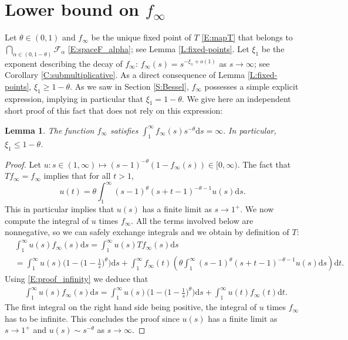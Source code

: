 \documentclass[11pt]{article}
\newtheorem{lemma}[theorem]{Lemma}
\theoremstyle{remark}
\newcommand{\Fc}{\mathcal{F}}
\renewcommand{\d}{\mathrm{d}}
\numberwithin{equation}{section}
\begin{document}
\appendix

\section{Lower bound on \texorpdfstring{$f_\infty$}{f infinity}}\label{S:app_lower}
Let $\theta \in (0,1)$ and $f_\infty$ be the unique fixed point of $T$ \eqref{E:mapT} that belongs to $\bigcap_{\alpha \in (0,1-\theta)} \Fc_\alpha$ \eqref{E:spaceF_alpha}; see Lemma \ref{L:fixed-points}. Let $\xi_1$ be the exponent describing the decay of $f_\infty$: $f_\infty(s) = s^{-\xi_1+o(1)}$ as $s \to \infty$; see Corollary \ref{C:submultiplicative}.
As a direct consequence of Lemma \ref{L:fixed-points}, $\xi_1 \geq 1-\theta$.
As we saw in Section \ref{S:Bessel}, $f_\infty$ possesses a simple explicit expression, implying in particular that $\xi_1 = 1-\theta$.
We give here an independent short proof of this fact that does not rely on this expression:


\begin{lemma}\label{L:upper_bound_exponent}
The function $f_\infty$ satisfies
$
\int_1^\infty f_\infty(s) s^{-\theta} \d s = \infty.
$
In particular, $\xi_1 \leq 1-\theta$.
\end{lemma}

\begin{proof}
Let $u : s \in (1,\infty) \mapsto (s-1)^{-\theta} (1-f_\infty(s)) \in [0,\infty)$.
The fact that $Tf_\infty = f_\infty$ implies that for all $t > 1$,
\begin{equation}
\label{E:proof_infinity}
u(t) = \theta \int_1^\infty (s-1)^\theta (s+t-1)^{-\theta -1} u(s) \d s.
\end{equation}
This in particular implies that $u(s)$ has a finite limit as $s \to 1^+$.
We now compute the integral of $u$ times $f_\infty$. All the terms involved below are nonnegative, so we can safely exchange integrals and we obtain by definition of $T$:
\begin{align*}
& \int_1^\infty u(s) f_\infty(s) \d s
= \int_1^\infty u(s) T f_\infty (s) \d s \\
& = \int_1^\infty u(s) \Big( 1 - \Big(1-\frac1{s}\Big)^\theta \Big) \d s
+ \int_1^\infty f_\infty(t) \left( \theta \int_1^\infty (s-1)^\theta (s+t-1)^{-\theta-1} u(s) \d s \right) \d t.
\end{align*}
Using \eqref{E:proof_infinity} we deduce that
\begin{align*}
& \int_1^\infty u(s) f_\infty(s) \d s
= \int_1^\infty u(s) \Big( 1 - \Big(1-\frac1{s}\Big)^\theta \Big) \d s
+ \int_1^\infty u(t) f_\infty(t) \d t.
\end{align*}
The first integral on the right hand side being positive, the integral of $u$ times $f_\infty$ has to be infinite. This concludes the proof since $u(s)$ has a finite limit as $s \to 1^+$ and $u(s) \sim s^{-\theta}$ as $s \to \infty$.
\end{proof}
\end{document}
